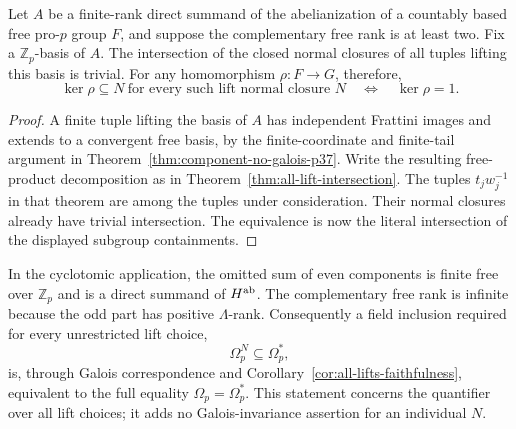 \begin{corollary}\label{cor:all-lifts-faithfulness}
Let $A$ be a finite-rank direct summand of the abelianization
of a countably based free pro-$p$ group $F$, and suppose the
complementary free rank is at least two.  Fix a
$\mathbb Z_p$-basis of $A$.  The intersection of the closed
normal closures of all tuples lifting this basis is trivial.
For any homomorphism $\rho:F\to G$, therefore,
\[
 \ker\rho\subseteq N\ \text{for every such lift normal closure }N
       \quad\Longleftrightarrow\quad \ker\rho=1.
\]
\end{corollary}

\begin{proof}
A finite tuple lifting the basis of $A$ has independent
Frattini images and extends to a convergent free basis, by
the finite-coordinate and finite-tail argument in
Theorem~\ref{thm:component-no-galois-p37}.
Write the resulting free-product decomposition as in
Theorem~\ref{thm:all-lift-intersection}.  The tuples
$t_jw_j^{-1}$ in that theorem are among the tuples under
consideration.  Their normal closures already have trivial
intersection.  The equivalence is now the literal
intersection of the displayed subgroup containments.
\end{proof}

In the cyclotomic application, the omitted sum of even
components is finite free over $\mathbb Z_p$ and is a direct
summand of $H^{\rm ab}$.  The complementary free rank is
infinite because the odd part has positive $\Lambda$-rank.
Consequently a field inclusion required for every unrestricted
lift choice,
\[
                   \Omega_p^N\subseteq\Omega_p^*,
\]
is, through Galois correspondence and
Corollary~\ref{cor:all-lifts-faithfulness}, equivalent to the
full equality $\Omega_p=\Omega_p^*$.
This statement concerns the quantifier over all lift choices;
it adds no Galois-invariance assertion for an individual $N$.

